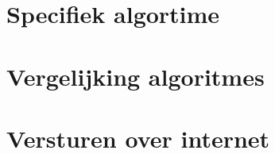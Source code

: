 \documentclass[a4paper]{article}
\begin{document}



\part{Specifiek algortime}


\part{Vergelijking algoritmes}


\part{Versturen over internet}

\end{document}
